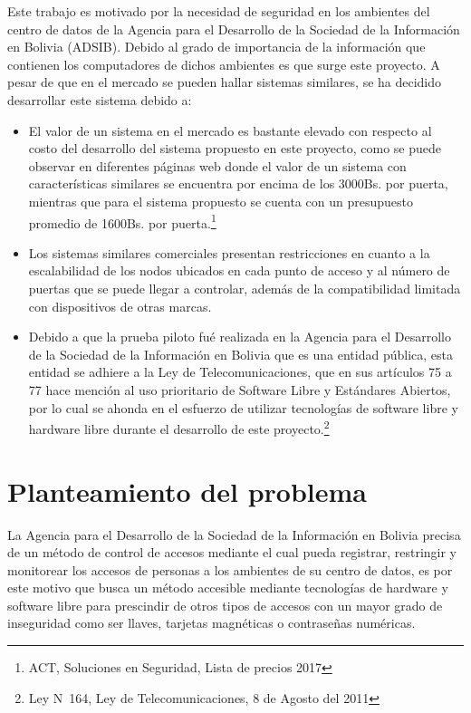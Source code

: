 \documentclass[../principal.tex]{subfiles}
\begin{document}
  Este trabajo es motivado por la necesidad de seguridad en los ambientes del centro de datos de la Agencia para el Desarrollo de la Sociedad de la Información en Bolivia (ADSIB). Debido al grado de importancia de la información que contienen los computadores de dichos ambientes es que surge este proyecto. A pesar de que en el mercado se pueden hallar sistemas similares, se ha decidido desarrollar este sistema debido a:
  \begin{itemize}
  \setlength\itemsep{0.1em}
    \item El valor de un sistema en el mercado es bastante elevado con respecto al costo del desarrollo del sistema propuesto en este proyecto, como se puede observar en diferentes páginas web donde el valor de un sistema con características similares se encuentra por encima de los 3000Bs. por puerta, mientras que para el sistema propuesto se cuenta con un presupuesto promedio de 1600Bs. por puerta.\href{http://www.jmsystems.es/files/Lista%20de%20Precios%20Control%20de%20Acceso.pdf}{\footnote{ACT, Soluciones en Seguridad, Lista de precios 2017}}
    \item Los sistemas similares comerciales presentan restricciones en cuanto a la escalabilidad de los nodos ubicados en cada punto de acceso y al número de puertas que se puede llegar a controlar, además de la compatibilidad limitada con dispositivos de otras marcas.
    \item Debido a que la prueba piloto fué realizada en la Agencia para el Desarrollo de la Sociedad de la Información en Bolivia que es una entidad pública, esta entidad se adhiere a la Ley de Telecomunicaciones, que en sus artículos 75 a 77 hace mención al uso prioritario de Software Libre y Estándares Abiertos, por lo cual se ahonda en el esfuerzo de utilizar tecnologías de software libre y hardware libre durante el desarrollo de este proyecto.\href{http://www.wipo.int/edocs/lexdocs/laws/es/bo/bo052es.pdf}{\footnote{Ley N\degree\ 164, Ley de Telecomunicaciones, 8 de Agosto del 2011}}

  \end{itemize}

  \section{Planteamiento del problema}

  La Agencia para el Desarrollo de la Sociedad de la Información en Bolivia precisa de un método de control de accesos mediante el cual pueda registrar, restringir y monitorear los accesos de personas a los ambientes de su centro de datos, es por este motivo que busca un método accesible mediante tecnologías de hardware y software libre para prescindir de otros tipos de accesos con un mayor grado de inseguridad como ser llaves, tarjetas magnéticas o contraseñas numéricas.
\end{document}
